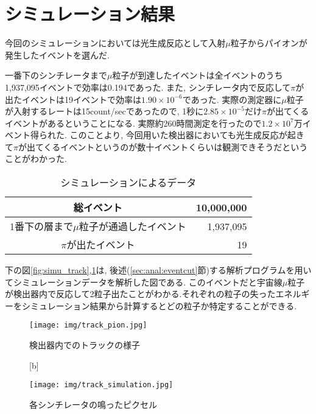\section{シミュレーション結果}
今回のシミュレーションにおいては光生成反応として入射$\mu$粒子からパイオンが発生したイベントを選んだ.

一番下のシンチレータまで$\mu$粒子が到達したイベントは全イベントのうち1,937,095イベントで効率は0.194であった.
また, シンチレータ内で反応して$\pi$が出たイベントは19イベントで効率は$1.90 \times10^{-6}$であった.
実際の測定器に$\mu$粒子が入射するレートは15count/secであったので, 1秒に$2.85 \times10^{-5}$だけ$\pi$が出てくるイベントがあるということになる.
実際約260時間測定を行ったので$1.2 \times10^{7}$万イベント得られた.
このことより, 今回用いた検出器においても光生成反応が起きて$\pi$が出てくるイベントというのが数十イベントくらいは観測できそうだということがわかった.

\begin{table}[H]
    \centering
    \caption{シミュレーションによるデータ}
    \label{tab:simu_data}
    \begin{tabular}{|c|r|}
        \hline
        総イベント                               & 10,000,000 \\ \hline
        1番下の層まで$\mu$粒子が通過したイベント & 1,937,095  \\ \hline
        $\pi$が出たイベント                      & 19         \\ \hline
    \end{tabular}
\end{table}

下の図\ref{fig:simu_track},\ref{fig:simu_pixel}は, 後述(\ref{sec:anal:eventcut}節)する解析プログラムを用いてシミュレーションデータを解析した図である.
このイベントだと宇宙線$\mu$粒子が検出器内で反応して2粒子出たことがわかる.それぞれの粒子の失ったエネルギーをシミュレーション結果から計算するとどの粒子か特定することができる.
\begin{figure}[H]
    \begin{minipage}[b]{0.47\linewidth}
        \centering
        \texttt{[image: img/track\_pion.jpg]}
        \caption{検出器内でのトラックの様子}
        \label{fig:simu_track}
    \end{minipage}[b]
    \begin{minipage}[b]{0.47\linewidth}
        \centering
        \texttt{[image: img/track\_simulation.jpg]}
        \caption{各シンチレータの鳴ったピクセル}
        \label{fig:simu_pixel}
    \end{minipage}
\end{figure}

